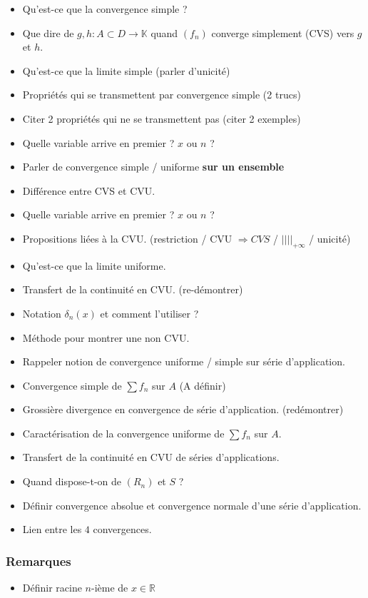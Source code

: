 \documentclass[a4paper, 11pt, hidelinks]{article}
\begin{document}
\begin{itemize}
    \item Qu'est-ce que la convergence simple ?
    \item Que dire de $g,h : A\subset D \to \mathbb{K}$ quand $(f_n)$ converge simplement (CVS) vers $g$ et $h$.
    \item Qu'est-ce que la limite simple (parler d'unicité)
    \item Propriétés qui se transmettent par convergence simple (2 trucs)
    \item Citer 2 propriétés qui ne se transmettent pas (citer 2 exemples)
    \item Quelle variable arrive en premier ? $x$ ou $n$ ?
    \item Parler de convergence simple / uniforme \textbf{sur un ensemble}
    \item Différence entre CVS et CVU.
    \item Quelle variable arrive en premier ? $x$ ou $n$ ?
    \item Propositions liées à la CVU. (restriction / CVU $\Rightarrow CVS$ / $||||_{+\infty}$ / unicité)
    \item Qu'est-ce que la limite uniforme.
    \item Transfert de la continuité en CVU. (re-démontrer)
    \item Notation $\delta_n(x)$ et comment l'utiliser ?
    \item Méthode pour montrer une non CVU.
    \item Rappeler notion de convergence uniforme / simple sur série d'application.
    \item Convergence simple de $\sum f_n$ sur $A$ (A définir)
    \item Grossière divergence en convergence de série d'application. (redémontrer)
    \item Caractérisation de la convergence uniforme de $\sum f_n$ sur $A$.
    \item Transfert de la continuité en CVU de séries d'applications.
    \item Quand dispose-t-on de $(R_n)$ et $S$ ?
    \item Définir convergence absolue et convergence normale d'une série d'application.
    \item Lien entre les $4$ convergences.
\end{itemize}




\subsubsection{Remarques}
\begin{itemize}
    \item Définir racine $n$-ième de $x \in \mathbb{R}$
\end{itemize}
\end{document}
